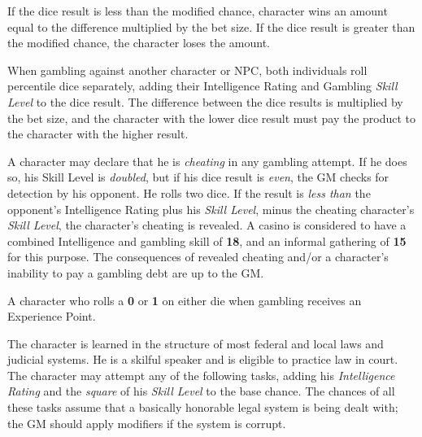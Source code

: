 If the dice result is less than the modified chance, character wins an
amount equal to the difference multiplied by the bet size.  If the dice
result is greater than the modified chance, the character loses the
amount.

When gambling against another character or NPC, both individuals roll
percentile dice separately, adding their Intelligence Rating and
Gambling \emph{Skill Level} to the dice result.  The difference between
the dice results is multiplied by the bet size, and the character with
the lower dice result must pay the product to the character with the
higher result.

A character may declare that he is \emph{cheating} in any gambling
attempt.  If he does so, his Skill Level is \emph{doubled}, but if his
dice result is \emph{even}, the GM checks for detection by his
opponent.  He rolls two dice.  If the result is \emph{less than} the
opponent's Intelligence Rating plus his \emph{Skill Level}, minus the
cheating character's \emph{Skill Level}, the character's cheating is
revealed.  A casino is considered to have a combined Intelligence and
gambling skill of \textbf{18}, and an informal gathering of
\textbf{15} for this purpose.  The consequences of revealed cheating
and/or a character's inability to pay a gambling debt are up to the
GM.

A character who rolls a \textbf{0} or \textbf{1} on either die when
gambling receives an Experience Point.

\label{sec:skill-law}

The character is learned in the structure of most federal and local
laws and judicial systems.  He is a skilful speaker and is eligible to
practice law in court.  The character may attempt any of the following
tasks, adding his \emph{Intelligence Rating} and the \emph{square} of
his \emph{Skill Level} to the base chance.  The chances of all these
tasks assume that a basically honorable legal system is being dealt
with; the GM should apply modifiers if the system is corrupt.

